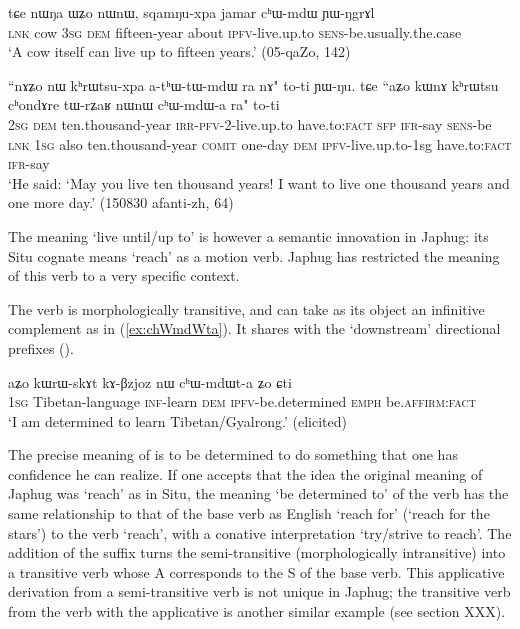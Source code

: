  \begin{exe}
\ex \label{ex:chWmdW}
\gll tɕe nɯŋa ɯʑo nɯnɯ, sqamŋu-xpa jamar cʰɯ-mdɯ ɲɯ-ŋgrɤl\\
\textsc{lnk} cow \textsc{3sg} \textsc{dem} fifteen-year about \textsc{ipfv}-live.up.to \textsc{sens}-be.usually.the.case \\
\glt `A cow itself can live up to fifteen years.' (05-qaZo, 142)
\end{exe}

 \begin{exe}
\ex \label{ex:chWmdWa}
\gll ``nɤʑo nɯ kʰrɯtsu-xpa a-tʰɯ-tɯ-mdɯ ra nɤ" to-ti ɲɯ-ŋu. tɕe ``aʑo kɯnɤ kʰrɯtsu cʰondɤre tɯ-rʑaʁ nɯnɯ cʰɯ-mdɯ-a ra" to-ti \\
\textsc{2sg} \textsc{dem} ten.thousand-year \textsc{irr}-\textsc{pfv}-2-live.up.to have.to:\textsc{fact} \textsc{sfp} \textsc{ifr}-say \textsc{sens}-be \textsc{lnk} \textsc{1sg} also  ten.thousand-year \textsc{comit} one-day \textsc{dem} \textsc{ipfv}-live.up.to-1sg have.to:\textsc{fact} \textsc{ifr}-say \\
\glt `He said: `May you live ten thousand years! I want to live one thousand years and one more day.' (150830 afanti-zh, 64)
\end{exe}

The meaning `live until/up to' is however a semantic innovation in Japhug: its Situ cognate  means `reach' as a motion verb. Japhug has restricted the meaning of this verb to a very specific context.

The verb  is morphologically transitive, and can take as its object an infinitive complement as in (\ref{ex:chWmdWta}). It shares with  the `downstream' directional prefixes ().

 \begin{exe}
\ex \label{ex:chWmdWta}
\gll aʑo kɯrɯ-skɤt kɤ-βzjoz nɯ cʰɯ-mdɯt-a ʑo ɕti \\
\textsc{1sg} Tibetan-language \textsc{inf}-learn \textsc{dem} \textsc{ipfv}-be.determined \textsc{emph} be.\textsc{affirm}:\textsc{fact} \\
\glt `I am determined to learn Tibetan/Gyalrong.' (elicited)
\end{exe}

The precise meaning of   is to be determined to do something that one has confidence he can realize. If one accepts that the idea the original meaning of Japhug  was `reach' as in Situ, the meaning `be determined to' of the verb  has the same relationship to that of the base verb as English `reach for' (`reach for the stars') to the verb `reach', with a conative interpretation `try/strive to reach'.  The addition of the suffix  turns the semi-transitive (morphologically intransitive)  into a transitive verb whose A corresponds to the S of the base verb. This applicative derivation from a semi-transitive verb is not unique in Japhug; the transitive verb  from the verb  with the  applicative is another similar example (see section XXX).


